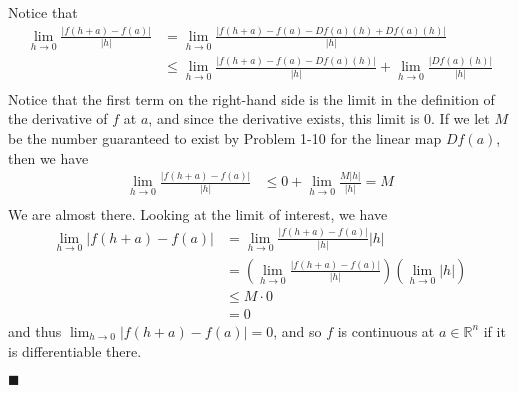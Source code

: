 \documentclass[12pt]{article}
\renewcommand{\qed}{\hfill$\blacksquare$}
\renewenvironment{proof}{\begin{addmargin}[1em]{0em}\begin{newproof}}{\end{newproof}\end{addmargin}\qed}
\begin{document}
\begin{proof}
Notice that
\begin{equation*}\begin{split}
\lim_{h\rightarrow 0} \frac{\left|f\left(h+a\right)- f\left(a\right)\right|}{\left|h\right|} & = \lim_{h\rightarrow 0} \frac{\left| f\left(h+a\right) - f\left(a\right) - Df\left(a\right)\left(h\right) + Df\left(a\right)\left(h\right) \right|}{\left|h\right|} \\
& \leq \lim_{h\rightarrow 0} \frac{\left| f\left(h+a\right) - f\left(a\right) - Df\left(a\right)\left(h\right)\right|}{\left|h\right|}  + \lim_{h\rightarrow 0} \frac{\left|Df\left(a\right)\left(h\right)\right|}{\left|h\right|} \\
\end{split}\end{equation*}
Notice that the first term on the right-hand side is the limit in the definition of the derivative of $f$ at $a$, and since the derivative exists, this limit is $0$. If we let $M$ be the number guaranteed to exist by Problem 1-10 for the linear map $Df\left(a\right)$, then we have
\begin{equation*}
\begin{split}
\lim_{h\rightarrow 0} \frac{\left|f\left(h+a\right)- f\left(a\right)\right|}{\left|h\right|} & \leq 0 + \lim_{h\rightarrow 0} \frac{M \left|h\right|}{\left|h\right|} = M \\
\end{split}
\end{equation*}
We are almost there. Looking at the limit of interest, we have
\begin{equation*}
\begin{split}
\lim_{h\rightarrow 0} \left| f\left(h+a\right)-f\left(a\right)\right| & = \lim_{h\rightarrow 0} \frac{\left|f\left(h+a\right)-f\left(a\right)\right|}{\left|h\right|} \left|h\right| \\
& = \left( \lim_{h\rightarrow 0} \frac{\left|f\left(h+a\right)-f\left(a\right)\right|}{\left|h\right|} \right) \left(\lim_{h\rightarrow 0} \left|h\right| \right) \\
& \leq M \cdot 0\\
& = 0
\end{split}
\end{equation*}
and thus $\lim_{h\rightarrow 0} \left|f\left(h+a\right)-f\left(a\right)\right| = 0$, and so $f$ is continuous at $a \in \mathbb{R}^n$ if it is differentiable there.
\end{proof}
\end{document}
